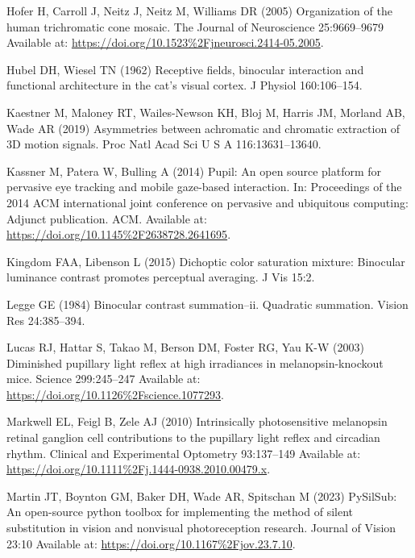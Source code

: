 \documentclass[
]{article}
\begin{document}
\leavevmode\hypertarget{ref-Hofer2005}{}%
Hofer H, Carroll J, Neitz J, Neitz M, Williams DR (2005) Organization of the human trichromatic cone mosaic. The Journal of Neuroscience 25:9669--9679 Available at: \url{https://doi.org/10.1523\%2Fjneurosci.2414-05.2005}.

\leavevmode\hypertarget{ref-Hubel1962}{}%
Hubel DH, Wiesel TN (1962) Receptive fields, binocular interaction and functional architecture in the cat's visual cortex. J Physiol 160:106--154.

\leavevmode\hypertarget{ref-Kaestner2019}{}%
Kaestner M, Maloney RT, Wailes-Newson KH, Bloj M, Harris JM, Morland AB, Wade AR (2019) Asymmetries between achromatic and chromatic extraction of 3D motion signals. Proc Natl Acad Sci U S A 116:13631--13640.

\leavevmode\hypertarget{ref-Kassner2014}{}%
Kassner M, Patera W, Bulling A (2014) Pupil: An open source platform for pervasive eye tracking and mobile gaze-based interaction. In: Proceedings of the 2014 ACM international joint conference on pervasive and ubiquitous computing: Adjunct publication. ACM. Available at: \url{https://doi.org/10.1145\%2F2638728.2641695}.

\leavevmode\hypertarget{ref-Kingdom2015}{}%
Kingdom FAA, Libenson L (2015) Dichoptic color saturation mixture: Binocular luminance contrast promotes perceptual averaging. J Vis 15:2.

\leavevmode\hypertarget{ref-Legge1984}{}%
Legge GE (1984) Binocular contrast summation--ii. Quadratic summation. Vision Res 24:385--394.

\leavevmode\hypertarget{ref-Lucas2003}{}%
Lucas RJ, Hattar S, Takao M, Berson DM, Foster RG, Yau K-W (2003) Diminished pupillary light reflex at high irradiances in melanopsin-knockout mice. Science 299:245--247 Available at: \url{https://doi.org/10.1126\%2Fscience.1077293}.

\leavevmode\hypertarget{ref-Markwell2010}{}%
Markwell EL, Feigl B, Zele AJ (2010) Intrinsically photosensitive melanopsin retinal ganglion cell contributions to the pupillary light reflex and circadian rhythm. Clinical and Experimental Optometry 93:137--149 Available at: \url{https://doi.org/10.1111\%2Fj.1444-0938.2010.00479.x}.

\leavevmode\hypertarget{ref-Martin2023}{}%
Martin JT, Boynton GM, Baker DH, Wade AR, Spitschan M (2023) PySilSub: An open-source python toolbox for implementing the method of silent substitution in vision and nonvisual photoreception research. Journal of Vision 23:10 Available at: \url{https://doi.org/10.1167\%2Fjov.23.7.10}.
\end{document}
